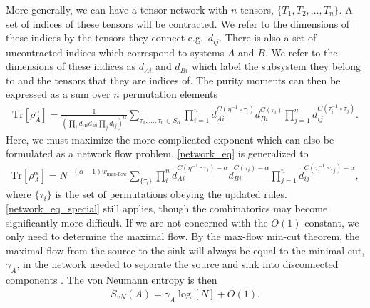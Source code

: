 \documentclass[a4paper,11pt]{article}
\newcommand{\Tr}{\text{Tr}}
\begin{document}
More generally, we can have a tensor network with $n$ tensors, $\{T_1, T_2, \dots, T_n \}$. A set of indices of these tensors will be contracted. We refer to the dimensions of these indices by the tensors they connect e.g.~$d_{ij}$. There is also a set of uncontracted indices which correspond to systems $A$ and $B$. We refer to the dimensions of these indices as $d_{Ai}$ and $d_{Bi}$ which label the subsystem they belong to and the tensors that they are indices of. The purity moments can then be expressed as a sum over $n$ permutation elements
\begin{align}
    \overline{\Tr\left[ \rho_A^{\alpha}\right]} = \frac{1}{(\prod_{i}d_{Ai} d_{Bi}\prod_j d_{ij})^{\alpha}} \sum_{\tau_1, \dots, \tau_n \in S_{\alpha}}\prod_{i=1}^n d_{Ai}^{C(\eta^{-1}\circ \tau_i)} d_{Bi}^{C(\tau_i)}\prod_{j=1}^n d_{ij}^{C(\tau_i^{-1} \circ \tau_j)}.
\end{align}
Here, we must maximize the more complicated exponent which can also be formulated as a network flow problem. \eqref{network_eq} is generalized to 
\begin{align}
    \overline{\Tr\left[ \rho_A^{\alpha}\right]} =N^{ - (\alpha-1) w_{\text{max-flow}} } \sum_{\{\tau_i\}} \prod_{i}^n\tilde{d}_{Ai}^{C(\eta^{-1}\circ \tau_i)-\alpha} \tilde{d}_{Bi}^{C(\tau_i)-\alpha}\prod_{j=1}^n \tilde{d}_{ij}^{C(\tau_i^{-1} \circ \tau_j)-\alpha},
\end{align}
where $\{ \tau_i\}$ is the set of permutations obeying the updated rules. 
\eqref{network_eq_special} still applies, though the combinatorics may become significantly more difficult. If we are not concerned with the $O(1)$ constant, we only need to determine the maximal flow. By the max-flow min-cut theorem, the maximal flow from the source to the sink will always be equal to the minimal cut, $\gamma_A$, in the network needed to separate the source and sink into disconnected components \cite{ford_fulkerson_1956,1056816}. The von Neumann entropy is then
\begin{align}
    S_{vN}(A) = \gamma_A \log\left[ N\right] + O(1).
\end{align}
\end{document}
